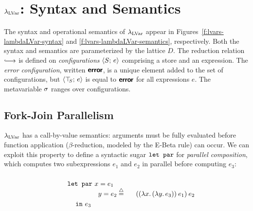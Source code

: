 \section{$\lambda_{\textrm{LVar}}$: Syntax and Semantics}\label{s:lvars-lambdalvar}


\FigLambdaLVarGrammar

\FigLambdaLVarSemantics

The syntax and operational semantics of $\lambda_{\textrm{LVar}}$ appear in
Figures~\ref{f:lvars-lambdaLVar-syntax} and
\ref{f:lvars-lambdaLVar-semantics}, respectively.  Both the
syntax and semantics are parameterized by the lattice $D$.  The
reduction relation $\parstepsto$ is defined on \emph{configurations}
$\langle S;\, e \rangle$ comprising a store and an expression.  The \emph{error
  configuration}, written $\textbf{\textsf{error}}$, is a unique element added to the
set of configurations, but $\langle \top\hspace{-0.85mm}_{S};\, e \rangle$ is equal to $\textbf{\textsf{error}}$
for all expressions $e$.  The metavariable $\sigma$ ranges over
configurations.


\subsection{Fork-Join Parallelism}\label{subsection:fork-join}

$\lambda_{\textrm{LVar}}$ has a call-by-value semantics: arguments must be fully
evaluated before function application ($\beta$-reduction, modeled by
the {\sc E-Beta} rule) can occur.  We can exploit this property to
define a syntactic sugar $\mbox{\texttt{\mbox{\texttt{let}}~\mbox{\texttt{par}}}}$ for \emph{parallel composition},
which computes two subexpressions $e_1$ and $e_2$ in parallel before
computing $e_3$:
\begin{displaymath}
\begin{minipage}[b]{0.8in}
  \begin{equation*}
\begin{split}
& \LETPAR ~x = e_1 \\ 
& \letparspace ~y = e_2 \\
& \letspace \IN~e_3 
\end{split}
\end{equation*}
\end{minipage}
\begin{minipage}[b]{0.6in}
\centering
$\defeq$
\end{minipage}
\begin{minipage}[b]{1in}
\begin{equation*}
  \app{(\app{(\lam{x}{(\lam{y}{e_3})})}{e_1})}{e_2}
\end{equation*}
\end{minipage}
\end{displaymath}

